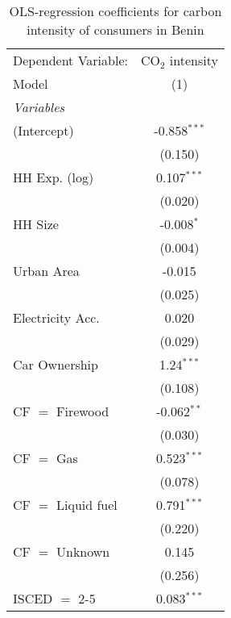 
\begin{table}[htbp!]
   \centering
   \small
   \begin{adjustbox}{width = 1\textwidth, max height = 0.95\textheight, center}
      \begin{threeparttable}[b]
         \caption{\label{tab:OLS_1_BEN} OLS-regression coefficients for carbon intensity of consumers in Benin}
         \begin{tabular}{lc}
            \tabularnewline \midrule \midrule
            Dependent Variable: & CO$_{2}$ intensity\\  
            Model               & (1)\\  
            \midrule
            \emph{Variables}\\
            (Intercept)         & -0.858$^{***}$\\   
                                & (0.150)\\   
            HH Exp. (log)       & 0.107$^{***}$\\   
                                & (0.020)\\   
            HH Size             & -0.008$^{*}$\\   
                                & (0.004)\\   
            Urban Area          & -0.015\\   
                                & (0.025)\\   
            Electricity Acc.    & 0.020\\   
                                & (0.029)\\   
            Car Ownership       & 1.24$^{***}$\\   
                                & (0.108)\\   
            CF $=$ Firewood     & -0.062$^{**}$\\   
                                & (0.030)\\   
            CF $=$ Gas          & 0.523$^{***}$\\   
                                & (0.078)\\   
            CF $=$ Liquid fuel  & 0.791$^{***}$\\   
                                & (0.220)\\   
            CF $=$ Unknown      & 0.145\\   
                                & (0.256)\\   
            ISCED $=$ 2-5       & 0.083$^{***}$\\   

\end{tabular}
\end{threeparttable}
\end{adjustbox}
\end{table}
